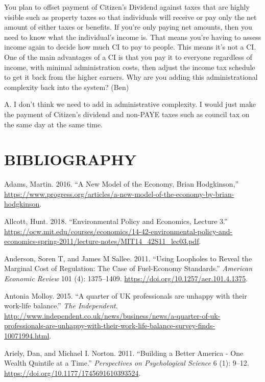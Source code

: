 \documentclass[]{tufte-handout}
\begin{document}
You plan to offset payment of Citizen's Dividend against taxes that are
highly visible such as property taxes so that individuals will receive
or pay only the net amount of either taxes or benefits. If you're only
paying net amounts, then you need to know what the individual's income
is. That means you're having to assess income again to decide how much
CI to pay to people. This means it's not a CI. One of the main
advantages of a CI is that you pay it to everyone regardless of income,
with minimal administration costs, then adjust the income tax schedule
to get it back from the higher earners. Why are you adding this
administrational complexity back into the system? (Ben)

A. I don't think we need to add in administrative complexity. I would
just make the payment of Citizen's dividend and non-PAYE taxes such as
council tax on the same day at the same time.

\hypertarget{bibliography}{%
\section*{BIBLIOGRAPHY}\label{bibliography}}

\hypertarget{refs}{}
\leavevmode\hypertarget{ref-Adams2016}{}%
Adams, Martin. 2016. ``A New Model of the Economy, Brian Hodgkinson,''
\url{https://www.progress.org/articles/a-new-model-of-the-economy-by-brian-hodgkinson}.

\leavevmode\hypertarget{ref-Allcott2018}{}%
Allcott, Hunt. 2018. ``Environmental Policy and Economics, Lecture 3.''
\url{https://ocw.mit.edu/courses/economics/14-42-environmental-policy-and-economics-spring-2011/lecture-notes/MIT14_42S11_lec03.pdf}.

\leavevmode\hypertarget{ref-Anderson2011}{}%
Anderson, Soren T, and James M Sallee. 2011. ``Using Loopholes to Reveal
the Marginal Cost of Regulation: The Case of Fuel-Economy Standards.''
\emph{American Economic Review} 101 (4): 1375--1409.
\url{https://doi.org/10.1257/aer.101.4.1375}.

\leavevmode\hypertarget{ref-AntoniaMolloy2015}{}%
Antonia Molloy. 2015. ``A quarter of UK professionals are unhappy with
their work-life balance.'' \emph{The Independent}.
\url{http://www.independent.co.uk/news/business/news/a-quarter-of-uk-professionals-are-unhappy-with-their-work-life-balance-survey-finds-10071994.html}.

\leavevmode\hypertarget{ref-Norton2011}{}%
Ariely, Dan, and Michael I. Norton. 2011. ``Building a Better America -
One Wealth Quintile at a Time.'' \emph{Perspectives on Psychological
Science} 6 (1): 9--12. \url{https://doi.org/10.1177/1745691610393524}.
\end{document}
